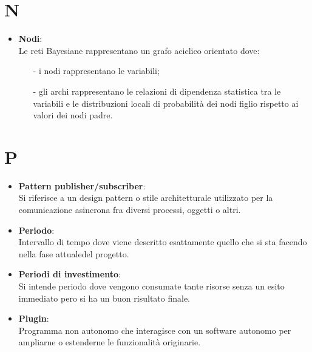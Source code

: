 \documentclass[a4paper, oneside, openany, dvipsnames, table]{article}
\begin{document}
\newpage
\section{N}
\begin{itemize}
\item \textbf{Nodi}:\\	Le reti Bayesiane rappresentano un grafo aciclico orientato dove:
\begin{itemize}
\item[-] i nodi rappresentano le variabili;
\item[-] gli archi rappresentano le relazioni di dipendenza statistica tra le variabili e le distribuzioni locali di probabilità dei nodi figlio rispetto ai valori dei nodi padre.
\end{itemize}
\end{itemize}

\newpage
\section{P}

\begin{itemize}
\item \textbf{Pattern publisher/subscriber}:\\	 Si riferisce a un design pattern o stile architetturale utilizzato per la comunicazione asincrona fra diversi processi, oggetti o altri.
\end{itemize}

\begin{itemize}
\item \textbf{Periodo}:\\	Intervallo di tempo dove viene descritto esattamente quello che si sta facendo nella fase attualedel progetto.
\end{itemize}

\begin{itemize}
\item \textbf{Periodi di investimento}:\\	Si intende periodo dove vengono consumate tante risorse senza un esito immediato pero si ha un buon risultato finale.

\end{itemize}

\begin{itemize}
\item \textbf{Plugin}:\\	Programma non autonomo che interagisce con un software autonomo per ampliarne o estenderne le funzionalità originarie.
\end{itemize}
\end{document}
